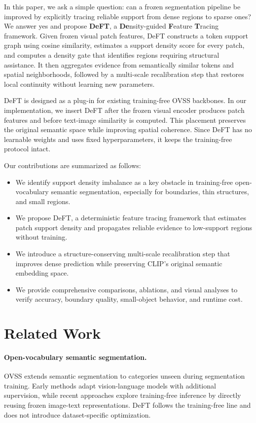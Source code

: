 \documentclass[letterpaper]{article}
\begin{document}
In this paper, we ask a simple question: can a frozen segmentation pipeline be
improved by explicitly tracing reliable support from dense regions to sparse
ones? We answer yes and propose \textbf{DeFT}, a \textbf{De}nsity-guided
\textbf{F}eature \textbf{T}racing framework. Given frozen visual patch features,
DeFT constructs a token support graph using cosine similarity, estimates a
support density score for every patch, and computes a density gate that
identifies regions requiring structural assistance. It then aggregates evidence
from semantically similar tokens and spatial neighborhoods, followed by a
multi-scale recalibration step that restores local continuity without learning
new parameters.

DeFT is designed as a plug-in for existing training-free OVSS backbones. In our
implementation, we insert DeFT after the frozen visual encoder produces patch
features and before text-image similarity is computed. This placement preserves
the original semantic space while improving spatial coherence. Since DeFT has no
learnable weights and uses fixed hyperparameters, it keeps the training-free
protocol intact.

Our contributions are summarized as follows:
\begin{itemize}
    \item We identify support density imbalance as a key obstacle in
    training-free open-vocabulary semantic segmentation, especially for
    boundaries, thin structures, and small regions.
    \item We propose DeFT, a deterministic feature tracing framework that
    estimates patch support density and propagates reliable evidence to
    low-support regions without training.
    \item We introduce a structure-conserving multi-scale recalibration step
    that improves dense prediction while preserving CLIP's original semantic
    embedding space.
    \item We provide comprehensive comparisons, ablations, and visual analyses
    to verify accuracy, boundary quality, small-object behavior, and runtime
    cost.
\end{itemize}

\section{Related Work}

\paragraph{Open-vocabulary semantic segmentation.}
OVSS extends semantic segmentation to categories unseen during segmentation
training. Early methods adapt vision-language models with additional supervision,
while recent approaches explore training-free inference by directly reusing
frozen image-text representations. DeFT follows the training-free line and does
not introduce dataset-specific optimization.
\end{document}
